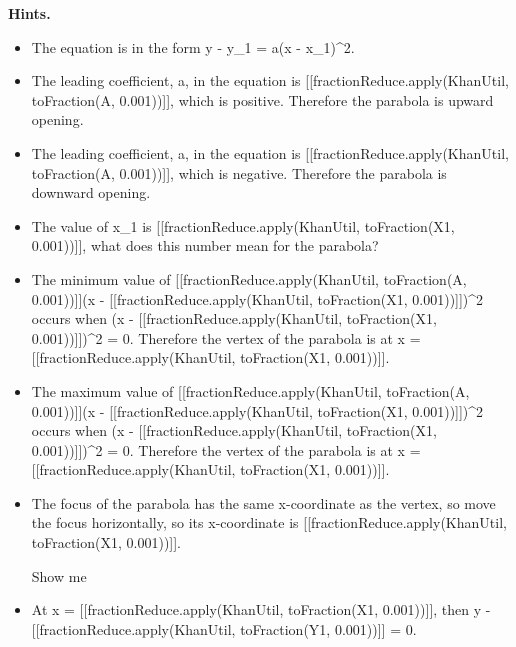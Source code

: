 \documentclass{article}
\begin{document}
\textbf{Hints.}
\begin{itemize}
  \item The equation is in the form y - y\_1 = a(x - x\_1)\textasciicircum{}2.
  \item The leading coefficient, a, in the equation is [[fractionReduce.apply(KhanUtil, toFraction(A, 0.001))]], which is positive.
                        Therefore the parabola is upward opening.
  \item The leading coefficient, a, in the equation is [[fractionReduce.apply(KhanUtil, toFraction(A, 0.001))]], which is negative.
                        Therefore the parabola is downward opening.
  \item The value of x\_1 is [[fractionReduce.apply(KhanUtil, toFraction(X1, 0.001))]], what does this number mean for the parabola?
  \item The minimum value of [[fractionReduce.apply(KhanUtil, toFraction(A, 0.001))]](x - [[fractionReduce.apply(KhanUtil, toFraction(X1, 0.001))]])\textasciicircum{}2 occurs when
                        (x - [[fractionReduce.apply(KhanUtil, toFraction(X1, 0.001))]])\textasciicircum{}2 = 0.
                        Therefore the vertex of the parabola is at x = [[fractionReduce.apply(KhanUtil, toFraction(X1, 0.001))]].
  \item The maximum value of [[fractionReduce.apply(KhanUtil, toFraction(A, 0.001))]](x - [[fractionReduce.apply(KhanUtil, toFraction(X1, 0.001))]])\textasciicircum{}2 occurs when
                        (x - [[fractionReduce.apply(KhanUtil, toFraction(X1, 0.001))]])\textasciicircum{}2 = 0.
                        Therefore the vertex of the parabola is at x = [[fractionReduce.apply(KhanUtil, toFraction(X1, 0.001))]].
  \item The focus of the parabola has the same x-coordinate as the vertex,
                            so move the focus horizontally, so its x-coordinate is [[fractionReduce.apply(KhanUtil, toFraction(X1, 0.001))]].
                        
                        
                            Show me
  \item At x = [[fractionReduce.apply(KhanUtil, toFraction(X1, 0.001))]], then y - [[fractionReduce.apply(KhanUtil, toFraction(Y1, 0.001))]] = 0.
                        

\end{itemize}
\end{document}
